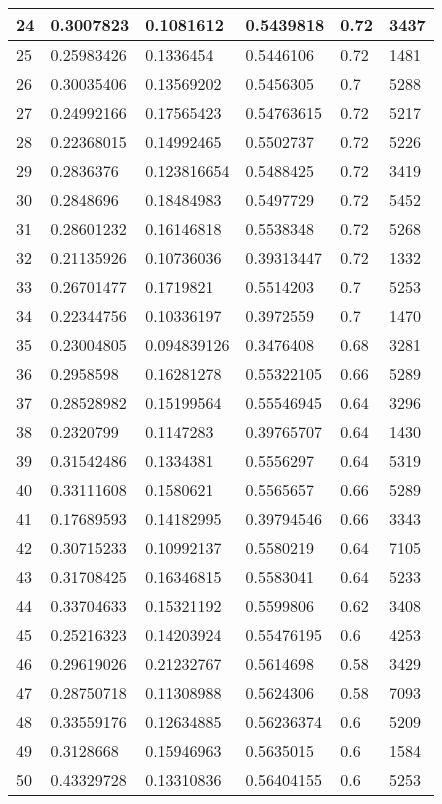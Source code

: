 \begin{longtable}{|l|l|l|l|l|l|}
24 & 0.3007823 & 0.1081612 & 0.5439818 & 0.72 & 3437 \\ \hline 
25 & 0.25983426 & 0.1336454 & 0.5446106 & 0.72 & 1481 \\ \hline 
26 & 0.30035406 & 0.13569202 & 0.5456305 & 0.7 & 5288 \\ \hline 
27 & 0.24992166 & 0.17565423 & 0.54763615 & 0.72 & 5217 \\ \hline 
28 & 0.22368015 & 0.14992465 & 0.5502737 & 0.72 & 5226 \\ \hline 
29 & 0.2836376 & 0.123816654 & 0.5488425 & 0.72 & 3419 \\ \hline 
30 & 0.2848696 & 0.18484983 & 0.5497729 & 0.72 & 5452 \\ \hline 
31 & 0.28601232 & 0.16146818 & 0.5538348 & 0.72 & 5268 \\ \hline 
32 & 0.21135926 & 0.10736036 & 0.39313447 & 0.72 & 1332 \\ \hline 
33 & 0.26701477 & 0.1719821 & 0.5514203 & 0.7 & 5253 \\ \hline 
34 & 0.22344756 & 0.10336197 & 0.3972559 & 0.7 & 1470 \\ \hline 
35 & 0.23004805 & 0.094839126 & 0.3476408 & 0.68 & 3281 \\ \hline 
36 & 0.2958598 & 0.16281278 & 0.55322105 & 0.66 & 5289 \\ \hline 
37 & 0.28528982 & 0.15199564 & 0.55546945 & 0.64 & 3296 \\ \hline 
38 & 0.2320799 & 0.1147283 & 0.39765707 & 0.64 & 1430 \\ \hline 
39 & 0.31542486 & 0.1334381 & 0.5556297 & 0.64 & 5319 \\ \hline 
40 & 0.33111608 & 0.1580621 & 0.5565657 & 0.66 & 5289 \\ \hline 
41 & 0.17689593 & 0.14182995 & 0.39794546 & 0.66 & 3343 \\ \hline 
42 & 0.30715233 & 0.10992137 & 0.5580219 & 0.64 & 7105 \\ \hline 
43 & 0.31708425 & 0.16346815 & 0.5583041 & 0.64 & 5233 \\ \hline 
44 & 0.33704633 & 0.15321192 & 0.5599806 & 0.62 & 3408 \\ \hline 
45 & 0.25216323 & 0.14203924 & 0.55476195 & 0.6 & 4253 \\ \hline 
46 & 0.29619026 & 0.21232767 & 0.5614698 & 0.58 & 3429 \\ \hline 
47 & 0.28750718 & 0.11308988 & 0.5624306 & 0.58 & 7093 \\ \hline 
48 & 0.33559176 & 0.12634885 & 0.56236374 & 0.6 & 5209 \\ \hline 
49 & 0.3128668 & 0.15946963 & 0.5635015 & 0.6 & 1584 \\ \hline 
50 & 0.43329728 & 0.13310836 & 0.56404155 & 0.6 & 5253 \\ \hline 
\end{longtable}